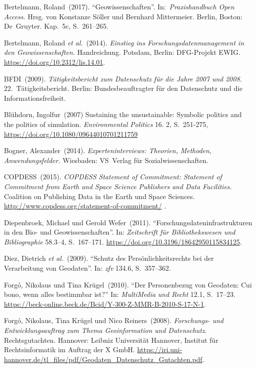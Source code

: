 \documentclass[a4paper,
fontsize=11pt,
oneside,
numbers=noperiodatend,
parskip=half-,
bibliography=totoc,
final
]{scrartcl}
\begin{document}
Bertelmann, Roland~(2017). \enquote{Geowissenschaften}.
In:~\emph{Praxishandbuch Open Access.} Hrsg. von Konstanze Söller und
Bernhard Mittermeier. Berlin, Boston: De~Gruyter. Kap.~5c, S.~261--265.

Bertelmann, Roland \emph{et al.}~(2014). \emph{Einstieg ins
Forschungsdatenmanagement in den Geowissenschaften.} Handreichung.
Potsdam, Berlin: DFG-Projekt EWIG.
\url{https://doi.org/10.2312/lis.14.01}.

BFDI~(2009). \emph{Tätigkeitsbericht zum Datenschutz für die Jahre 2007
und 2008.} 22.~Tätigkeitsbericht. Berlin: Bundesbeauftragter für den
Datenschutz und die Informationsfreiheit.

Blühdorn, Ingolfur~(2007) Sustaining the unsustainable: Symbolic
politics and the politics of simulation. \emph{Environmental Politics}
16. 2, S.~251-275, \url{https://doi.org/10.1080/09644010701211759}

Bogner, Alexander~(2014). \emph{Experteninterviews: Theorien, Methoden,
Anwendungsfelder.} Wiesbaden: VS~Verlag für Sozialwissenschaften.

COPDESS~(2015). \emph{COPDESS Statement of Commitment: Statement of
Commitment from Earth and Space Science Publishers and Data Facilities.}
Coalition on Publishing Data in the Earth und Space Sciences.
\url{http://www.copdess.org/statement-of-commitment/} .

Diepenbroek, Michael und Gerold Wefer~(2011).
\enquote{Forschungsdateninfrastrukturen in den Bio- und
Geowissenschaften}. In: \emph{Zeitschrift für Bibliothekswesen und
Bibliographie} 58.3--4, S.~167--171.
\url{https://doi.org/10.3196/18642950115834125}.

Diez, Dietrich \emph{et al.}~(2009). \enquote{Schutz des
Persönlichkeitsrechts bei der Verarbeitung von Geodaten}. In: \emph{zfv}
134.6, S.~357--362.

Forgó, Nikolaus und Tina Krügel~(2010). \enquote{Der Personenbezug von
Geodaten: Cui bono, wenn alles bestimmbar ist?} In: \emph{MultiMedia und
Recht} 12.1, S.~17--23.\\
\url{https://beck-online.beck.de/Bcid/Y-300-Z-MMR-B-2010-S-17-N-1}.

Forgó, Nikolaus, Tina Krügel und Nico Reiners~(2008). \emph{Forschungs-
und Entwicklungsauftrag zum Thema Geoinformation und Datenschutz}.
Rechtsgutachten. Hannover: Leibniz Universität Hannover, Institut für
Rechtsinformatik im Auftrag der X GmbH.
\url{https://iri.uni-hannover.de/tl_files/pdf/Geodaten_Datenschutz_Gutachten.pdf}.
\end{document}
